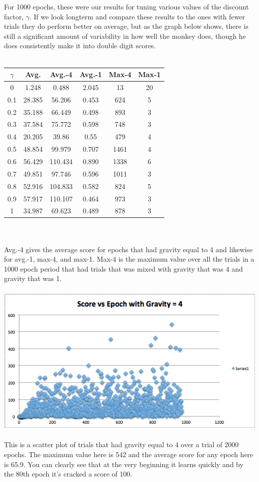 \documentclass[11pt]{article}
\begin{document}
For 1000 epochs, these were our results for tuning various values of the discount factor, $\gamma$.  If we look longterm and compare these results to the ones with fewer trials they do perform better on average, but as the graph below shows, there is still a significant amount of variability in how well the monkey does, though he does consistently make it into double digit scores.  
\\\\
\begin{tabular}{c|c|c|c|c|c}
$\gamma$ & Avg. & Avg.-4 & Avg.-1 & Max-4 & Max-1 \\
\hline
0 & 1.248 & 0.488 & 2.045 & 13 & 20 \\ 
0.1 & 28.385 & 56.206 & 0.453 & 624 & 5 \\ 
0.2 & 35.188 & 66.449 & 0.498 & 893 & 3 \\ 
0.3 & 37.584 & 75.772 & 0.598 & 748 & 3 \\ 
0.4 & 20.205 & 39.86 & 0.55 & 479 & 4 \\ 
0.5 & 48.854 & 99.979 & 0.707 & 1461 & 4 \\ 
0.6 & 56.429 & 110.434 & 0.890 & 1338 & 6 \\
0.7 & 49.851 & 97.746 & 0.596 & 1011 & 3 \\ 
0.8 & 52.916 & 104.833 & 0.582 & 824 & 5 \\ 
0.9 & 57.917 & 110.107 & 0.464 & 973 & 3 \\ 
1 & 34.987 & 69.623 & 0.489 & 878 & 3
\end{tabular} 
\\
\\
Avg.-4 gives the average score for epochs that had gravity equal to 4 and likewise for avg.-1, max-4, and max-1.  Max-4 is the maximum value over all the trials in a 1000 epoch period that had trials that was mixed with gravity that was 4 and gravity that was 1. 
\\
\\
\includegraphics[scale=0.8]{G_4_Graph.png} \\\\
This is a scatter plot of trials that had gravity equal to 4 over a trial of 2000 epochs.  The maximum value here is 542 and the average score for any epoch here is 65.9.  You can clearly see that at the very beginning it learns quickly and by the 80th epoch it's cracked a score of 100.  
\end{document}
